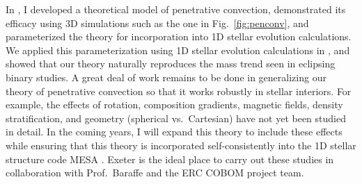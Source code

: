 \documentclass[12pt]{article}
\begin{document}
In \citet{anders_etal_2022a}, I developed a theoretical model of penetrative convection, demonstrated its efficacy using 3D simulations such as the one in Fig.~\ref{fig:penconv}, and parameterized the theory for incorporation into 1D stellar evolution calculations.
We applied this parameterization using 1D stellar evolution calculations in \citet{jermyn_etal_2022}, and showed that our theory naturally reproduces the mass trend seen in eclipsing binary studies.
A great deal of work remains to be done in generalizing our theory of penetrative convection so that it works robustly in stellar interiors.
For example, the effects of rotation, composition gradients, magnetic fields, density stratification, and geometry (spherical vs.~Cartesian) have not yet been studied in detail.
In the coming years, I will expand this theory to include these effects while ensuring that this theory is incorporated self-consistently into the 1D stellar structure code MESA \citep{paxton_etal_2011}.
Exeter is the ideal place to carry out these studies in collaboration with Prof.~Baraffe and the ERC COBOM project team.
\end{document}
